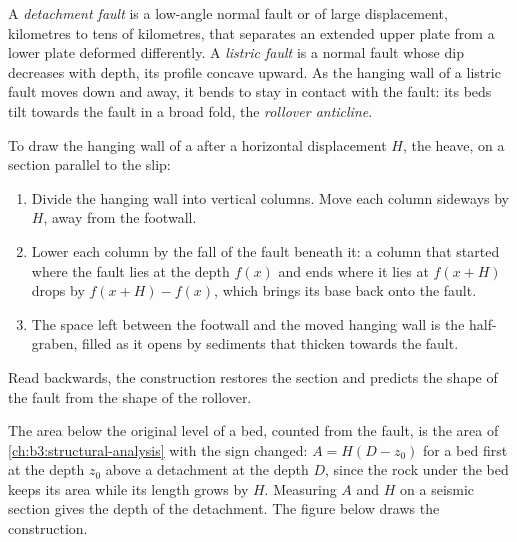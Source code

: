 \begin{definition}\label{def:b3:extension-strike-slip:detachment}
A \emph{detachment fault} is a low-angle normal fault
or  of large displacement, kilometres to tens of kilometres, that
separates an extended upper plate from a lower plate deformed differently. A
\emph{listric fault} is a normal fault whose dip
decreases with depth, its profile concave upward. As the hanging wall of a
listric fault moves down and away, it bends to stay in contact with the
fault: its beds tilt towards the fault in a broad fold, the \emph{rollover
anticline}.
\end{definition}

\begin{method}\label{met:b3:extension-strike-slip:heave}
To draw the hanging wall of a  after a horizontal displacement
$H$, the heave, on a section parallel to the slip:
\begin{enumerate}
  \item Divide the hanging wall into vertical columns. Move each column
        sideways by $H$, away from the footwall.
  \item Lower each column by the fall of the fault beneath it: a column that
        started where the fault lies at the depth $f(x)$ and ends where it
        lies at $f(x + H)$ drops by $f(x + H) - f(x)$, which brings its base
        back onto the fault.
  \item The space left between the footwall and the moved hanging wall is the
        half-graben, filled as it opens by sediments that thicken towards the
        fault.
\end{enumerate}
Read backwards, the construction restores the section and predicts the shape
of the fault from the shape of the rollover.
\end{method}

The area below the original level of a bed, counted from the fault, is
the area of \cref{ch:b3:structural-analysis} with the sign changed: $A =
H(D - z_0)$ for a bed first at the depth $z_0$ above a detachment at the
depth $D$, since the rock under the bed keeps its area while its length grows
by $H$. Measuring $A$ and $H$ on a seismic section gives the depth of the
detachment. The figure below draws the construction.

